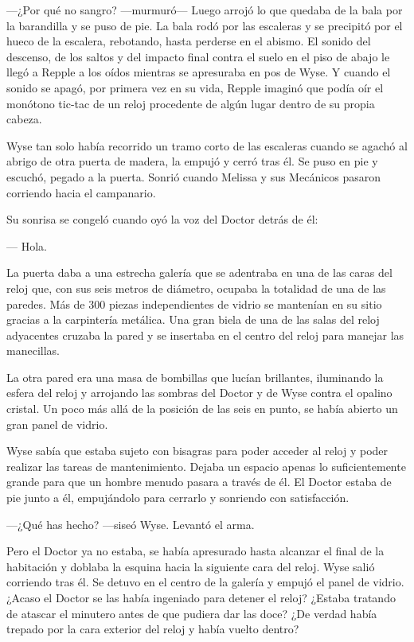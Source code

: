 {---¿Por qué no sangro? ---murmuró--- Luego arrojó lo que quedaba de la
	bala por la barandilla y se puso de pie. La bala rodó por las escaleras
	y se precipitó por el hueco de la escalera, rebotando, hasta perderse en
	el abismo. El sonido del descenso, de los saltos y del impacto final
	contra el suelo en el piso de abajo le llegó a Repple a los oídos
	mientras se apresuraba en pos de Wyse. Y cuando el sonido se apagó, por
	primera vez en su vida, Repple imaginó que podía oír el monótono tic-tac
de un reloj procedente de algún lugar dentro de su propia cabeza.}

{Wyse tan solo había recorrido un tramo corto de las escaleras cuando se
	agachó al abrigo de otra puerta de madera, la empujó y cerró tras él. Se
	puso en pie y escuchó, pegado a la puerta. Sonrió cuando Melissa y sus
Mecánicos pasaron corriendo hacia el campanario.}

{Su sonrisa se congeló cuando oyó la voz del Doctor detrás de él:}

{--- Hola.}

\mbox{}

{La puerta daba a una estrecha galería que se adentraba en una de las
	caras del reloj que, con sus seis metros de diámetro, ocupaba la
	totalidad de una de las paredes. Más de 300 piezas independientes de
	vidrio se mantenían en su sitio gracias a la carpintería metálica. Una
	gran biela de una de las salas del reloj adyacentes cruzaba la pared y
se insertaba en el centro del reloj para manejar las manecillas.}

{La otra pared era una masa de bombillas que lucían brillantes,
	iluminando la esfera del reloj y arrojando las sombras del Doctor y de
	Wyse contra el opalino cristal. Un poco más allá de la posición de las
seis en punto, se había abierto un gran panel de vidrio.}

{Wyse sabía que estaba sujeto con bisagras para poder acceder al reloj y
	poder realizar las tareas de mantenimiento. Dejaba un espacio apenas lo
	suficientemente grande para que un hombre menudo pasara a través de él.
	El Doctor estaba de pie junto a él, empujándolo para cerrarlo y
sonriendo con satisfacción.}

{---¿Qué has hecho? ---siseó Wyse. Levantó el arma.}

{Pero el Doctor ya no estaba, se había apresurado hasta alcanzar el
	final de la habitación y doblaba la esquina hacia la siguiente cara del
	reloj. Wyse salió corriendo tras él. Se detuvo en el centro de la
	galería y empujó el panel de vidrio. ¿Acaso el Doctor se las había
	ingeniado para detener el reloj? ¿Estaba tratando de atascar el minutero
	antes de que pudiera dar las doce? ¿De verdad había trepado por la cara
exterior del reloj y había vuelto dentro?}

